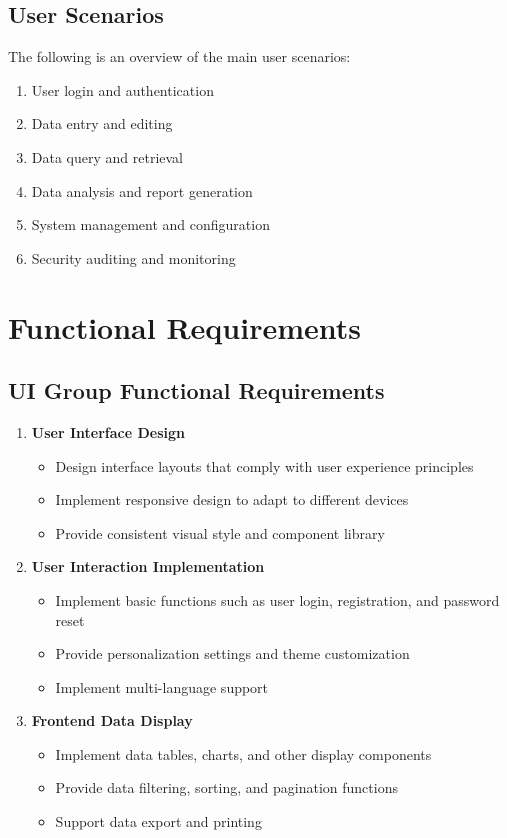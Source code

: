 \documentclass[a4paper,12pt]{article}
\begin{document}
\subsection{User Scenarios}

The following is an overview of the main user scenarios:

\begin{enumerate}
  \item User login and authentication
  \item Data entry and editing
  \item Data query and retrieval
  \item Data analysis and report generation
  \item System management and configuration
  \item Security auditing and monitoring
\end{enumerate}

\section{Functional Requirements}

\subsection{UI Group Functional Requirements}

\begin{enumerate}
  \item \textbf{User Interface Design}
  \begin{itemize}
    \item Design interface layouts that comply with user experience principles
    \item Implement responsive design to adapt to different devices
    \item Provide consistent visual style and component library
  \end{itemize}
  
  \item \textbf{User Interaction Implementation}
  \begin{itemize}
    \item Implement basic functions such as user login, registration, and password reset
    \item Provide personalization settings and theme customization
    \item Implement multi-language support
  \end{itemize}
  
  \item \textbf{Frontend Data Display}
  \begin{itemize}
    \item Implement data tables, charts, and other display components
    \item Provide data filtering, sorting, and pagination functions
    \item Support data export and printing
  \end{itemize}
\end{enumerate}
\end{document}
